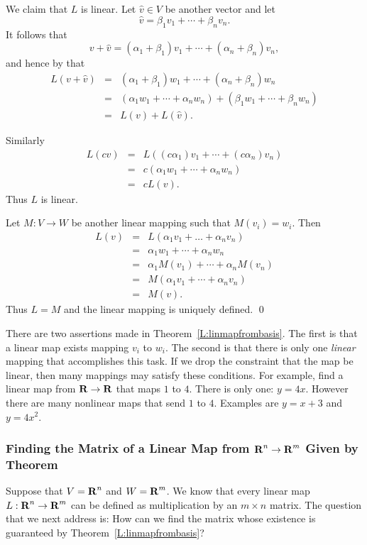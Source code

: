 We claim that $L$ is linear.  Let $\hat{v}\in V$ be another
vector and let
\[
\hat{v} = \beta_1v_1+\cdots+\beta_nv_n.
\]
It follows that
\[
v+\hat{v} = (\alpha_1+\beta_1)v_1+\cdots+(\alpha_n+\beta_n)v_n,
\]
and hence by  that
\begin{eqnarray*}
L(v+\hat{v}) & = &
(\alpha_1+\beta_1)w_1+\cdots+(\alpha_n+\beta_n)w_n\\
& = & (\alpha_1w_1+\cdots+\alpha_nw_n) +
(\beta_1w_1+\cdots+\beta_nw_n)  \\
& = & L(v) + L(\hat{v}).
\end{eqnarray*}

Similarly
\begin{eqnarray*}
L(cv) &  = & L( (c\alpha_1)v_1+\cdots +(c\alpha_n)v_n)\\
& = & c(\alpha_1w_1+\cdots+\alpha_nw_n)\\
& = & cL(v).
\end{eqnarray*}
Thus $L$ is linear.

Let $M:V\to W$ be another linear mapping such that $M(v_i)=w_i$.
Then
\begin{eqnarray*}
L(v) & = & L(\alpha_1v_1+\ldots +\alpha_nv_n)\\
& = & \alpha_1w_1+\cdots+\alpha_nw_n \\
& = & \alpha_1M(v_1) + \cdots +\alpha_nM(v_n)\\
& = & M(\alpha_1v_1 + \cdots +\alpha_nv_n)\\
& = & M(v).
\end{eqnarray*}
Thus $L=M$ and the linear mapping is uniquely defined.  \qed


There are two assertions made in Theorem~\ref{L:linmapfrombasis}.
The first is that a linear map exists mapping $v_i$ to $w_i$.
The second is that there is only one {\em linear\/} mapping
that accomplishes this task.  If we drop the constraint that the
map be linear, then many mappings may satisfy these conditions.
For example, find a linear map from $\mbox{$\bf{R}$}\to\mbox{$\bf{R}$}$ that maps $1$ to $4$.
There is only one: $y=4x$.  However there are many nonlinear maps
that send $1$ to $4$.  Examples are $y=x+3$ and $y=4x^2$.

\subsubsection*{Finding the Matrix of a Linear Map from $\mbox{$\bf{R}$}^n\to\mbox{$\bf{R}$}^m$
Given by Theorem~\protect{\ref{L:linmapfrombasis}}}

Suppose that $V=\mbox{$\bf{R}$}^n$ and $W=\mbox{$\bf{R}$}^m$.  We know that every linear
map $L:\mbox{$\bf{R}$}^n\to\mbox{$\bf{R}$}^m$ can be defined as multiplication by an
$m\times n$ matrix.  The question that we next address is:
How can we find the matrix whose existence is guaranteed by
Theorem~\ref{L:linmapfrombasis}?

